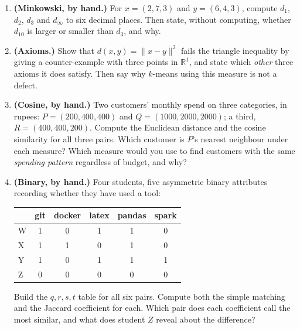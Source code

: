 \documentclass[11pt]{article}
\begin{document}
\begin{enumerate}[leftmargin=*]
  \item \textbf{(Minkowski, by hand.)} For $x = (2, 7, 3)$ and
    $y = (6, 4, 3)$, compute $d_1$, $d_2$, $d_3$ and $d_\infty$ to six
    decimal places. Then state, without computing, whether $d_{10}$ is
    larger or smaller than $d_3$, and why.

  \item \textbf{(Axioms.)} Show that $d(x,y) = \|x-y\|^2$ fails the triangle
    inequality by giving a counter-example with three points in
    $\mathbb{R}^1$, and state which \emph{other} three axioms it does
    satisfy. Then say why $k$-means using this measure is not a defect.

  \item \textbf{(Cosine, by hand.)} Two customers' monthly spend on three
    categories, in rupees: $P = (200, 400, 400)$ and
    $Q = (1000, 2000, 2000)$; a third, $R = (400, 400, 200)$. Compute the
    Euclidean distance and the cosine similarity for all three pairs. Which
    customer is $P$'s nearest neighbour under each measure? Which measure
    would you use to find customers with the same \emph{spending pattern}
    regardless of budget, and why?

  \item \textbf{(Binary, by hand.)} Four students, five asymmetric binary
    attributes recording whether they have used a tool:
    \begin{center}
    \begin{tabular}{lccccc}
      \toprule
      & git & docker & latex & pandas & spark \\ \midrule
      W & 1 & 0 & 1 & 1 & 0 \\
      X & 1 & 1 & 0 & 1 & 0 \\
      Y & 1 & 0 & 1 & 1 & 1 \\
      Z & 0 & 0 & 0 & 0 & 0 \\ \bottomrule
    \end{tabular}
    \end{center}
    Build the $q,r,s,t$ table for all six pairs. Compute both the simple
    matching and the Jaccard coefficient for each. Which pair does each
    coefficient call the most similar, and what does student $Z$ reveal
    about the difference?


\end{enumerate}
\end{document}
